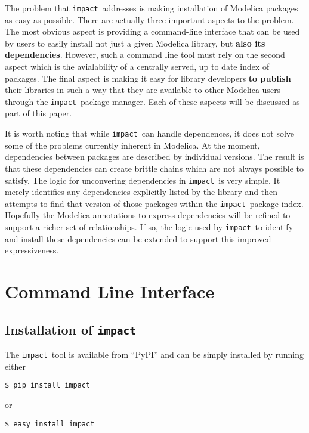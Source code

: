 \documentclass[11pt,a4paper,twocolumn]{article}
\newcommand{\impact}{\texttt{impact}} %
\begin{document}
The problem that \impact\ addresses is making installation of Modelica
packages as easy as possible.  There are actually three important
aspects to the problem.  The most obvious aspect is providing a
command-line interface that can be used by users to easily install not
just a given Modelica library, but \textbf{also its dependencies}.
However, such a command line tool must rely on the second aspect which
is the avialability of a centrally served, up to date index of
packages.  The final aspect is making it easy for library developers
\textbf{to publish} their libraries in such a way that they are
available to other Modelica users through the \impact\ package
manager.  Each of these aspects will be discussed as part of this
paper.

It is worth noting that while \impact\ can handle dependences, it
does not solve some of the problems currently inherent in Modelica.  At
the moment, dependencies between packages are described by individual
versions.  The result is that these dependencies can create brittle
chains which are not always possible to satisfy. The logic for
unconvering dependencies in \impact\ is very simple.  It merely
identifies any dependencies explicitly listed by the library and then
attempts to find that version of those packages within the
\impact\ package index. Hopefully the Modelica annotations to express
dependencies will be refined to support a richer set of relationships.
If so, the logic used by \impact\ to identify and install these
dependencies can be extended to support this improved expressiveness.

\section{Command Line Interface}
\label{sec:command_line}

\subsection{Installation of \impact}
\label{sec:install}

The \impact\ tool is available from ``PyPI''\cite{pypi} and
can be simply installed by running either

\lstset{language=bash}
\begin{lstlisting}
$ pip install impact
\end{lstlisting}
or
\begin{lstlisting}
$ easy_install impact
\end{lstlisting}
\end{document}

